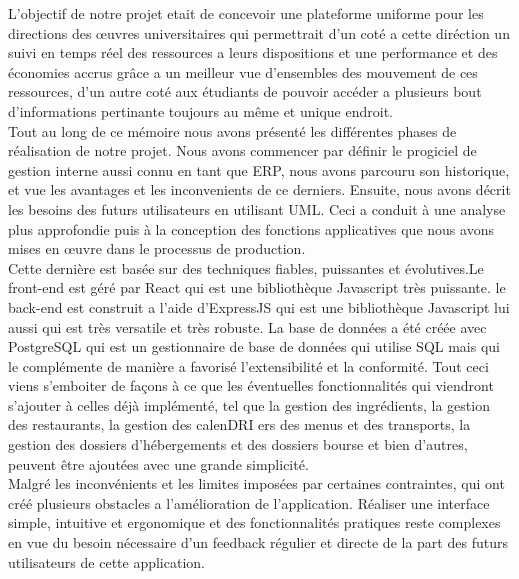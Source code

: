 \renewcommand{\thechapter}{}
\renewcommand{\chaptername}{}

L'objectif de notre projet etait de concevoir une plateforme uniforme pour les directions des œuvres universitaires qui permettrait d'un coté a cette diréction un suivi en temps réel des ressources a leurs dispositions et une performance et des économies accrus grâce a un meilleur vue d'ensembles des mouvement de ces ressources, d'un autre coté aux étudiants de pouvoir accéder a plusieurs bout d'informations pertinante toujours au même et unique endroit.\\

Tout au long de ce mémoire nous avons présenté les différentes phases de réalisation de notre projet. Nous avons commencer par définir le progiciel de gestion interne aussi connu en tant que \acs{ERP}, nous avons parcouru son historique, et vue les avantages et les inconvenients de ce derniers. Ensuite, nous avons décrit les besoins des futurs utilisateurs en utilisant UML. Ceci a conduit à une analyse plus approfondie puis à la conception des fonctions applicatives que nous avons mises en œuvre dans le processus de production.\\

Cette dernière est basée sur des techniques fiables, puissantes et évolutives.Le front-end est géré par React qui est une bibliothèque Javascript très puissante. le back-end est construit a l'aide d'ExpressJS qui est une bibliothèque Javascript lui aussi qui est très versatile et très robuste. La base de données a été créée avec PostgreSQL qui est un gestionnaire de base de données qui utilise \acs{SQL} mais qui le complémente de manière a favorisé l'extensibilité et la conformité. Tout ceci viens s'emboiter de façons à ce que les éventuelles fonctionnalités qui viendront s'ajouter à celles déjà implémenté, tel que la gestion des ingrédients, la gestion des restaurants, la gestion des calen\acs{DRI} ers des menus et des transports, la gestion des dossiers d'hébergements et des dossiers bourse et bien d'autres, peuvent être ajoutées avec une grande simplicité.\\

Malgré les inconvénients et les limites imposées par certaines contraintes, qui ont créé plusieurs obstacles a l'amélioration de l'application. Réaliser une interface simple, intuitive et ergonomique et des fonctionnalités pratiques reste complexes en vue du besoin nécessaire d'un feedback régulier et directe de la part des futurs utilisateurs de cette application.\\

